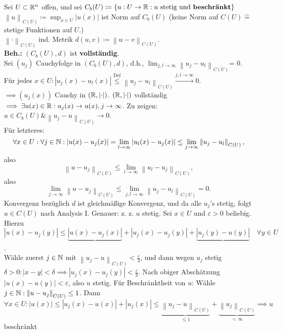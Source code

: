\begin{subexample}
	Sei $ U \subset  \mathbb{R} ^n $ offen, und sei $ C_b(U) \coloneqq \left\{ u : U \to \mathbb{R} : u \text{ stetig und \textbf{beschränkt}}  \right\}  $ $ \left\| u \right\| _{C(U)} \coloneqq \sup_{x \in U} \left| u(x) \right|  $ ist Norm auf $ C_{b} (U) $ (keine Norm auf $ C(U) \hat{=}  $ stetige Funktionen auf $ U $.)\\
	$ \left\| \cdot  \right\| _{C(U)}  $ ind. Metrik $ d(u, v) \coloneqq \left\| u - v \right\| _{C(U)}  $.\\
	\textbf{Beh.:} $ ( C_b(U), d) $ ist \textbf{vollständig}.\\
	Sei $ (u_j) $ Cauchyfolge in $ (C_b(U), d) $, d.h., $ \lim_{j, l \to \infty} \left\| u_j - u_l \right\| _{C(U)}  $= 0.\\
	Für jedes $ x \in U: \left| u_j(x) - u_l(x) \right| \overset{\text{Def} }{\leq } \left\| u_j - u_l \right\| _{C(U)} \overset{j, l \to \infty}{\longrightarrow} 0. $\\
	$ \implies (u_j(x)) $ Cauchy in $ (\mathbb{R} , \left| \cdot  \right| ) $. $ (\mathbb{R} , \left| \cdot  \right| ) $ vollständig $ \implies \exists u(x) \in \mathbb{R} : u_j(x) \to u(x), j \to \infty $. Zu zeigen: $ u \in C_b(U) \& \left\| u_j - u \right\| _{C(U)} \to 0 $.\\
	Für letzteres:
	\[
		\forall x \in U: \forall j\in \mathbb{N} : \left| u(x) - u_j(x) \right| = \lim_{l \to \infty} \left| u_l(x) - u_j(x) \right| \leq \lim_{j \to \infty} \left\| u_j - u_l \right\| _{C(U)},
	\]
	also
	\[
		\left\| u - u_j \right\| _{C(U)} \leq  \lim_{l \to \infty} \left\| u_l - u_j \right\| _{C(U)},
	\]
	also
	\[
		\lim_{j \to \infty} \left\| u - u_j \right\| _{C(U)} \leq \lim_{j, l \to \infty} \left\| u_j - u_l \right\| _{C(U)} = 0.
	\]
	Konvergenz bezüglich $ d $ ist gleichmäßige Konvergenz, und da alle $ u_j $'s stetig, folgt $ u \in C(U) $ nach Analysis I.
	Genauer: z. z. $ u $ stetig.
	Sei $ x \in U $ und $ \varepsilon > 0 $ beliebig.
	Hierzu $ \left| u(x) - u_j(y) \right| \leq \underbrace{\left| u(x) - u_j(x) \right| }_{} + \left| u_j(x) - u_j(y) \right| + \underbrace{\left| u_j(y) - u(y) \right|}_{} \quad \forall y \in U $.\\
	Wähle zuerst $ j \in \mathbb{N}  $ mit $ \left\| u_j - u \right\| _{C(U)} < \frac{ \varepsilon }{ 3 }  $, und dann wegen $ u_j $ stetig $ \delta > 0 : \left| x - y \right| < \delta \implies \left| u_j(x) - u_j(y) \right| < \frac{ \varepsilon }{ 3 }  $.
	Nach obiger Abschätzung $ \left| u(x) - u(y) \right| < \varepsilon  $, also $ u $ stetig.
	Für Beschränktheit von $ u $:
	Wähle $ j \in \mathbb{N} : \left\| u - u_j \right\| _{C(U)} \leq 1 $. Dann $ \forall x \in U: \left| u(x) \right| \leq \left| u_j(x) - u(x) \right| + \left| u_j(x) \right| \leq \underbrace{\left\| u_j - u \right\| _{C(U)} }_{\leq 1} + \underbrace{\left\| u_j \right\| _{C(U)} }_{<\infty} \implies u $ beschränkt
\end{subexample}

